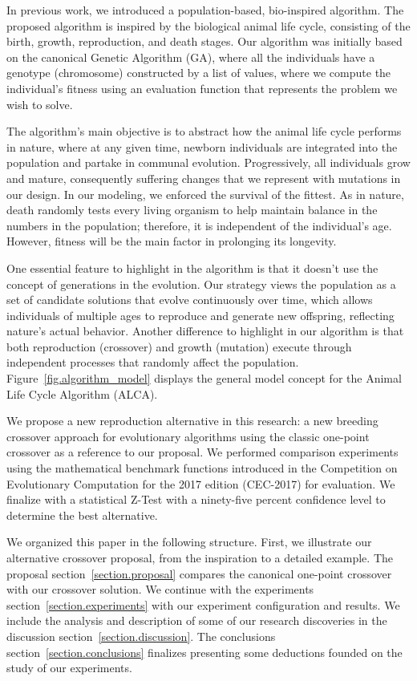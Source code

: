 \documentclass[graybox]{svmult}
\begin{document}
    In previous work, we introduced a population-based, bio-inspired algorithm\cite{Felix-Saul2022,Felix-Saul2023}. The proposed algorithm is inspired by the biological animal life cycle, consisting of the birth, growth, reproduction, and death stages\cite{read1968system}. Our algorithm was initially based on the canonical Genetic Algorithm (GA)\cite{holland1992genetic,holland1984genetic}, where all the individuals have a genotype (chromosome) constructed by a list of values, where we compute the individual's fitness using an evaluation function that represents the problem we wish to solve.
    
    The algorithm's main objective is to abstract how the animal life cycle performs in nature, where at any given time, newborn individuals are integrated into the population and partake in communal evolution. Progressively, all individuals grow and mature, consequently suffering changes that we represent with mutations in our design. In our modeling, we enforced the survival of the fittest. As in nature, death randomly tests every living organism to help maintain balance in the numbers in the population; therefore, it is independent of the individual's age. However, fitness will be the main factor in prolonging its longevity.

    One essential feature to highlight in the algorithm is that it doesn't use the concept of generations in the evolution. Our strategy views the population as a set of candidate solutions that evolve continuously over time, which allows individuals of multiple ages to reproduce and generate new offspring, reflecting nature's actual behavior. Another difference to highlight in our algorithm is that both reproduction (crossover) and growth (mutation) execute through independent processes that randomly affect the population. Figure~\ref{fig.algorithm_model} displays the general model concept for the Animal Life Cycle Algorithm (ALCA).

    We propose a new reproduction alternative in this research: a new breeding crossover approach for evolutionary algorithms using the classic one-point crossover as a reference to our proposal. We performed comparison experiments using the mathematical benchmark functions introduced in the Competition on Evolutionary Computation for the 2017 edition (CEC-2017) for evaluation. We finalize with a statistical Z-Test with a ninety-five percent confidence level to determine the best alternative.

    We organized this paper in the following structure. First, we illustrate our alternative crossover proposal, from the inspiration to a detailed example. The proposal section~\ref{section.proposal} compares the canonical one-point crossover with our crossover solution. We continue with the experiments section~\ref{section.experiments} with our experiment configuration and results. We include the analysis and description of some of our research discoveries in the discussion section~\ref{section.discussion}. The conclusions section~\ref{section.conclusions} finalizes presenting some deductions founded on the study of our experiments.
\end{document}
